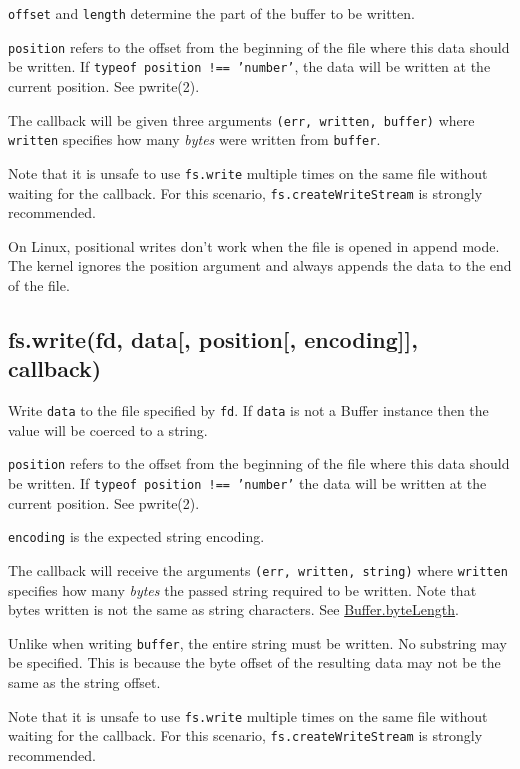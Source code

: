 \texttt{offset} and \texttt{length} determine the part of the buffer to
be written.

\texttt{position} refers to the offset from the beginning of the file
where this data should be written. If
\texttt{typeof position !== 'number'}, the data will be written at the
current position. See pwrite(2).

The callback will be given three arguments
\texttt{(err, written, buffer)} where \texttt{written} specifies how
many \emph{bytes} were written from \texttt{buffer}.

Note that it is unsafe to use \texttt{fs.write} multiple times on the
same file without waiting for the callback. For this scenario,
\texttt{fs.createWriteStream} is strongly recommended.

On Linux, positional writes don't work when the file is opened in append
mode. The kernel ignores the position argument and always appends the
data to the end of the file.

\subsection{fs.write(fd, data{[}, position{[}, encoding{]}{]},
callback)}\label{fs.writefd-data-position-encoding-callback}

Write \texttt{data} to the file specified by \texttt{fd}. If
\texttt{data} is not a Buffer instance then the value will be coerced to
a string.

\texttt{position} refers to the offset from the beginning of the file
where this data should be written. If
\texttt{typeof position !== 'number'} the data will be written at the
current position. See pwrite(2).

\texttt{encoding} is the expected string encoding.

The callback will receive the arguments \texttt{(err, written, string)}
where \texttt{written} specifies how many \emph{bytes} the passed string
required to be written. Note that bytes written is not the same as
string characters. See
\href{buffer.html\#buffer_class_method_buffer_bytelength_string_encoding}{Buffer.byteLength}.

Unlike when writing \texttt{buffer}, the entire string must be written.
No substring may be specified. This is because the byte offset of the
resulting data may not be the same as the string offset.

Note that it is unsafe to use \texttt{fs.write} multiple times on the
same file without waiting for the callback. For this scenario,
\texttt{fs.createWriteStream} is strongly recommended.

